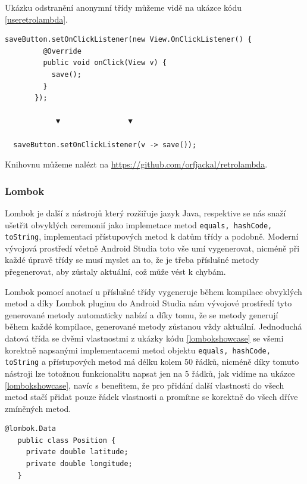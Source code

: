 \documentclass{article}
\begin{document}
Ukázku odstranění anonymní třídy můžeme vidě na ukázce kódu \ref{useretrolambda}.

\begin{lstlisting}[label=useretrolambda,caption=Odstrnění kódu anonymní třídy pomocí knihovny Retrolambda]
   saveButton.setOnClickListener(new View.OnClickListener() {
         @Override
         public void onClick(View v) {
           save();
         }
       });

            ▼                ▼

  saveButton.setOnClickListener(v -> save());
\end{lstlisting}

Knihovnu můžeme nalézt na \url{https://github.com/orfjackal/retrolambda}.

\subsubsection{Lombok}
Lombok je další z nástrojů který rozšiřuje jazyk Java, respektive se nás snaží ušetřit obvyklých
ceremonií jako implemetace metod \texttt{equals, hashCode, toString}, implementaci přístupových
metod k datům třídy a podobně. Moderní vývojová prostředí včetně Android Studia toto vše umí
vygenerovat, nicméně při každé úpravě třídy se musí myslet an to, že je třeba příslušné metody
přegenerovat, aby zůstaly aktuální, což může vést k chybám.

Lombok pomocí anotací u příslušné třídy vygeneruje během kompilace obvyklých metod a díky Lombok
pluginu do Android Studia nám vývojové prostředí tyto generované metody automaticky nabízí a díky tomu,
že se metody generují během každé kompilace, generované metody zůstanou vždy aktuální. Jednoduchá datová
třída se dvěmi vlastnostmi z ukázky kódu \ref{lombokshowcase} se všemi korektně napsanými implementacemi
metod objektu \texttt{equals, hashCode, toString} a přístupových metod má délku kolem 50 řádků, nicméně
díky tomuto nástroji lze totožnou funkcionalitu napsat jen na 5 řádků, jak vidíme na ukázce \ref{lombokshowcase},
navíc s benefitem, že pro přidání další vlastnosti do všech metod stačí přidat pouze řádek vlastnosti
a promítne se korektně do všech dříve zmíněných metod.

\begin{lstlisting}[label=lombokshowcase,caption=Datová třída používající Lombok]
   @lombok.Data
   public class Position {
     private double latitude;
     private double longitude;
   }
\end{lstlisting}
\end{document}
